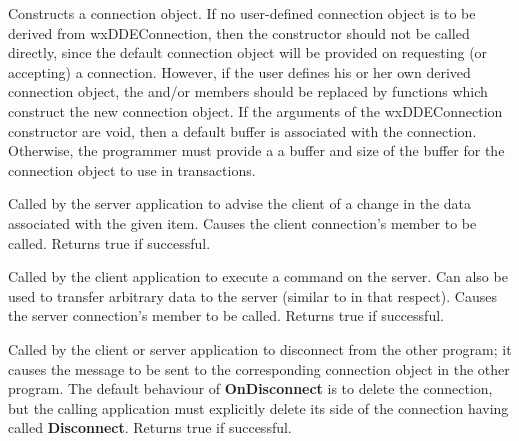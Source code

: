



Constructs a connection object. If no user-defined connection object is
to be derived from wxDDEConnection, then the constructor should not be
called directly, since the default connection object will be provided on
requesting (or accepting) a connection. However, if the user defines his
or her own derived connection object, the \rtfsp
and/or  members should be replaced by
functions which construct the new connection object. If the arguments of
the wxDDEConnection constructor are void, then a default buffer is
associated with the connection. Otherwise, the programmer must provide a
a buffer and size of the buffer for the connection object to use in
transactions.



Called by the server application to advise the client of a change in
the data associated with the given item. Causes the client
connection's 
member to be called. Returns true if successful.



Called by the client application to execute a command on the server. Can
also be used to transfer arbitrary data to the server (similar
to  in that respect). Causes the
server connection's  member to be
called. Returns true if successful.



Called by the client or server application to disconnect from the other
program; it causes the  message
to be sent to the corresponding connection object in the other
program. The default behaviour of {\bf OnDisconnect} is to delete the
connection, but the calling application must explicitly delete its
side of the connection having called {\bf Disconnect}. Returns true if
successful.

